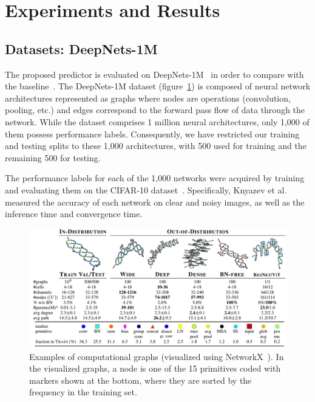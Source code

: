\documentclass{article}
\begin{document}
\section{Experiments and Results}

\subsection{Datasets: DeepNets-1M}
\label{DeepNets-1M_dataset}
The proposed predictor is evaluated on DeepNets-1M~\cite{ppuda} in order to compare with the baseline~\cite{NeurPred}. The DeepNets-1M dataset (figure~\ref{DeepNet1M}) is composed of neural network architectures represented as graphs where nodes are operations (convolution, pooling, etc.) and edges correspond to the forward pass flow of data through the network. While the dataset comprises 1 million neural architectures, only 1,000 of them possess performance labels. Consequently, we have restricted our training and testing splits to these 1,000 architectures, with 500 used for training and the remaining 500 for testing.

The performance labels for each of the 1,000 networks were acquired by training and evaluating them on the CIFAR-10 dataset~\cite{cifar10}. Specifically, Knyazev et al.~\cite{ppuda} measured the accuracy of each network on clear and noisy images, as well as the inference time and convergence time.

\begin{figure}
    \centering
    \includegraphics[width=\textwidth]{images/DeepNet1M.png}
    \caption{Examples of computational graphs (visualized using NetworkX~\cite{NetworkX}). In the visualized graphs, a node is one of the 15 primitives coded with markers shown at the bottom, where they are sorted by the frequency in the training set.}
    \label{DeepNet1M}
\end{figure}
\end{document}
